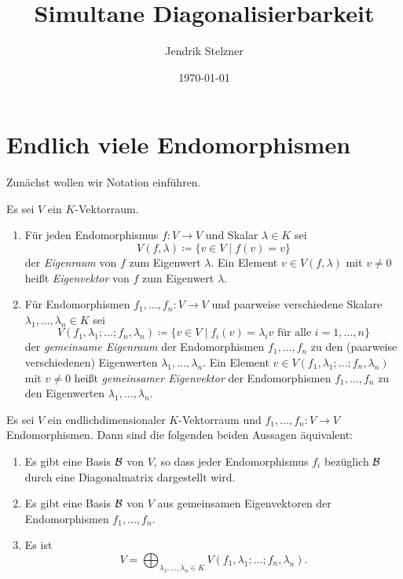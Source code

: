 \documentclass[a4paper,10pt]{article}
\title{Simultane Diagonalisierbarkeit}
\author{Jendrik Stelzner}
\date{\today}
\begin{document}
\maketitle










\section{Endlich viele Endomorphismen}


Zunächst wollen wir Notation einführen.


\begin{definition}
  Es sei $V$ ein $K$-Vektorraum.
  \begin{enumerate}
    \item
      Für jeden Endomorphismus $f \colon V \to V$ und Skalar $\lambda \in K$ sei
      \[
        V(f,\lambda) \coloneqq \{ v \in V \mid f(v) = v \}
      \]
      der \emph{Eigenraum} von $f$ zum Eigenwert $\lambda$.
      Ein Element $v \in V(f, \lambda)$ mit $v \neq 0$ heißt \emph{Eigenvektor} von $f$ zum Eigenwert $\lambda$.
    \item
      Für Endomorphismen $f_1, \dotsc, f_n \colon V \to V$ und paarweise verschiedene Skalare $\lambda_1, \dotsc, \lambda_n \in K$ sei
      \[
                  V(f_1, \lambda_1; \dotsc; f_n, \lambda_n)
        \coloneqq \{ v \in V \mid \text{$f_i(v) = \lambda_i v$ für alle $i = 1, \dotsc, n$} \}
      \]
      der \emph{gemeinsame Eigenraum} der Endomorphismen $f_1, \dotsc, f_n$ zu den (paarweise verschiedenen) Eigenwerten $\lambda_1, \dotsc, \lambda_n$.
      Ein Element $v \in V(f_1, \lambda_1; \dotsc; f_n, \lambda_n)$ mit $v \neq 0$ heißt \emph{gemeinsamer Eigenvektor} der Endomorphismen $f_1, \dotsc, f_n$ zu den Eigenwerten $\lambda_1, \dotsc, \lambda_n$.
  \end{enumerate}
\end{definition}


\begin{proposition}\label{prop: basis of common eigenvectors equivalent to sum of common eigenspaces}
  Es sei $V$ ein endlichdimensionaler $K$-Vektorraum und $f_1, \dotsc, f_n \colon V \to V$ Endomorphismen.
  Dann sind die folgenden beiden Aussagen äquivalent:
  \begin{enumerate}
    \item
      Es gibt eine Basis $\mathcal{B}$ von $V$, so dass jeder Endomorphismus $f_i$ bezüglich $\mathcal{B}$ durch eine Diagonalmatrix dargestellt wird.
    \item
      Es gibt eine Basis $\mathcal{B}$ von $V$ aus gemeinsamen Eigenvektoren der Endomorphismen $f_1, \dotsc, f_n$.
    \item
      Es ist
      \[
        V = \bigoplus_{\lambda_1, \dotsc, \lambda_n \in K} V(f_1, \lambda_1; \dotsc; f_n, \lambda_n).
      \]
  \end{enumerate}
\end{proposition}
\end{document}
